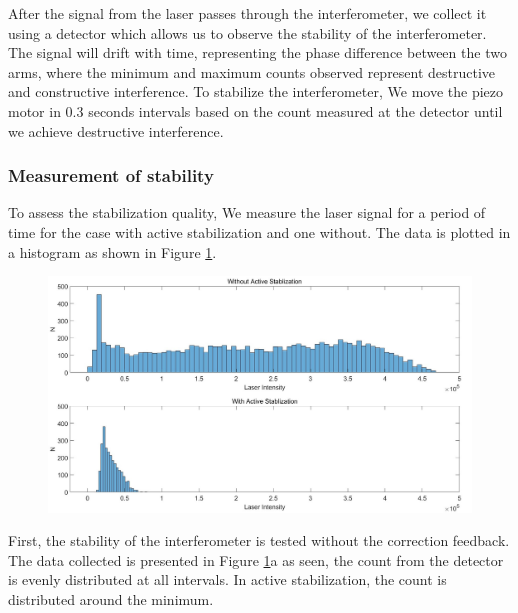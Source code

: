  After the signal from the laser passes through the interferometer, we collect it using a detector which allows us to observe the stability of the interferometer. The signal will drift with time, representing the  phase difference between the two arms, where the minimum and maximum counts observed represent destructive and constructive interference. To stabilize the interferometer, We move the piezo motor in 0.3 seconds intervals based on the count measured at the detector until we achieve destructive interference.
\subsubsection{Measurement of stability}
To assess the stabilization quality, We measure the laser signal for a period of time for the case with active stabilization and one without. The data is plotted in a histogram as shown in Figure \ref{fig:stablization_histogram}.
\begin{figure}[H]
	\centering
	\includegraphics[scale=0.32]{figures/StablizationHistogram.jpg}
	\caption{}
	\label{fig:stablization_histogram}
\end{figure}
First, the stability of the interferometer is tested without the correction feedback. The data collected is presented in Figure \ref{fig:stablization_histogram}a as seen, the count from the detector is evenly distributed at all intervals. In active stabilization, the count is distributed around the minimum.